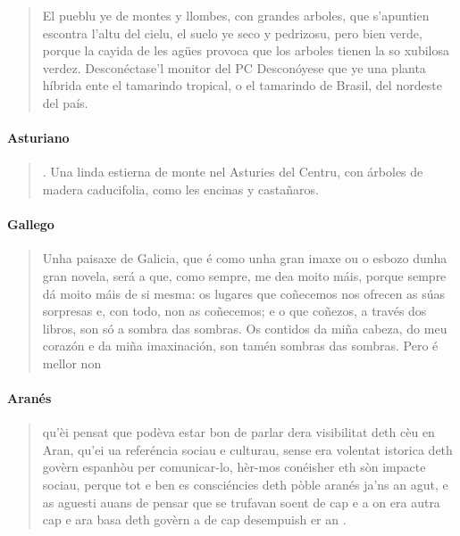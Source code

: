 \begin{quote}
El pueblu ye de montes y llombes, con grandes arboles, que s'apuntien escontra l'altu del cielu, el suelo ye seco y pedrizosu, pero bien verde, porque la cayida de les agües provoca que los arboles tienen la so xubilosa verdez.
Desconéctase'l monitor del PC
Desconóyese que ye una planta híbrida ente el tamarindo tropical, o el tamarindo de Brasil, del nordeste del país.
\end{quote}

\paragraph{Asturiano}

\begin{quote}
. Una linda estierna de monte nel Asturies del Centru, con árboles de madera caducifolia, como les encinas y castañaros.
\end{quote}

\paragraph{Gallego}

\begin{quote}
Unha paisaxe de Galicia, que é como unha gran imaxe ou o esbozo dunha gran novela, será a que, como sempre, me dea moito máis, porque sempre dá moito máis de si mesma: os lugares que coñecemos nos ofrecen as súas sorpresas e, con todo, non as coñecemos; e o que coñezos, a través dos libros, son só a sombra das sombras. Os contidos da miña cabeza, do meu corazón e da miña imaxinación, son tamén sombras das sombras. Pero é mellor non
\end{quote}

\paragraph{Aranés}

\begin{quote}
qu'èi pensat que podèva estar bon de parlar dera visibilitat deth cèu en Aran, qu'ei ua referéncia sociau e culturau, sense era volentat istorica deth govèrn espanhòu per comunicar-lo, hèr-mos conéisher eth sòn impacte sociau, perque tot e ben es consciéncies deth pòble aranés ja'ns an agut, e as aguesti auans de pensar que se trufavan soent de cap e a on era autra cap e ara basa deth govèrn a de cap desempuish er an .
\end{quote}


